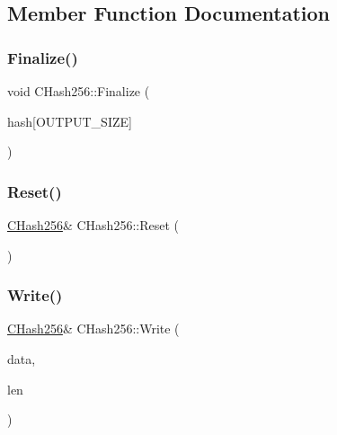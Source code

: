 \subsection{Member Function Documentation}
\mbox{\label{class_c_hash256_aa8a70c1b7cf24ce7d00240a1131cf4e7}} 
\subsubsection{\texorpdfstring{Finalize()}{Finalize()}}
{\footnotesize\ttfamily void C\+Hash256\+::\+Finalize (\begin{DoxyParamCaption}\item[{unsigned char}]{hash\mbox{[}\+O\+U\+T\+P\+U\+T\+\_\+\+S\+I\+Z\+E\mbox{]} }\end{DoxyParamCaption})\hspace{0.3cm}{\ttfamily [inline]}}

\mbox{\label{class_c_hash256_ab25b00e4cda7e209173f2ce90475953d}} 
\subsubsection{\texorpdfstring{Reset()}{Reset()}}
{\footnotesize\ttfamily \mbox{\hyperlink{class_c_hash256}{C\+Hash256}}\& C\+Hash256\+::\+Reset (\begin{DoxyParamCaption}{ }\end{DoxyParamCaption})\hspace{0.3cm}{\ttfamily [inline]}}

\mbox{\label{class_c_hash256_a9cc25033c6435cb28e2e8e377c949a7a}} 
\subsubsection{\texorpdfstring{Write()}{Write()}}
{\footnotesize\ttfamily \mbox{\hyperlink{class_c_hash256}{C\+Hash256}}\& C\+Hash256\+::\+Write (\begin{DoxyParamCaption}\item[{const unsigned char $\ast$}]{data,  }\item[{size\+\_\+t}]{len }\end{DoxyParamCaption})\hspace{0.3cm}{\ttfamily [inline]}}



